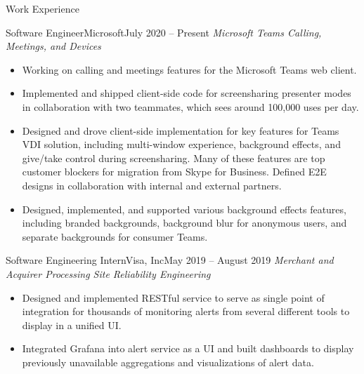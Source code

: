 \documentclass[]{mcdowellcv}
\begin{document}
	\makeheader
	
	
	\begin{cvsection}{Work Experience}
	
		\begin{cvsubsection}{Software Engineer}{Microsoft}{July 2020 -- Present}
			\emph{Microsoft Teams Calling, Meetings, and Devices}
			\begin{itemize}
				\item Working on calling and meetings features for the Microsoft Teams web client.
				\item Implemented and shipped client-side code for screensharing presenter modes in collaboration with two teammates, which sees around 100,000 uses per day.
				\item Designed and drove client-side implementation for key features for Teams VDI solution, including multi-window experience, background effects, and give/take control during screensharing. Many of these features are top customer blockers for migration from Skype for Business. Defined E2E designs in collaboration with internal and external partners.
				\item Designed, implemented, and supported various background effects features, including branded backgrounds, background blur for anonymous users, and separate backgrounds for consumer Teams.
			\end{itemize}
		\end{cvsubsection}
		
		\begin{cvsubsection}{Software Engineering Intern}{Visa, Inc}{May 2019 -- August 2019}
		\emph{Merchant and Acquirer Processing Site Reliability Engineering	}
			\begin{itemize}
				\item Designed and implemented RESTful service to serve as single point of integration for thousands of monitoring alerts from several different tools to display in a unified UI.
				\item Integrated Grafana into alert service as a UI and built dashboards to display previously unavailable aggregations and visualizations of alert data.			
			\end{itemize}
		\end{cvsubsection}
						

\end{cvsection}
\end{document}
